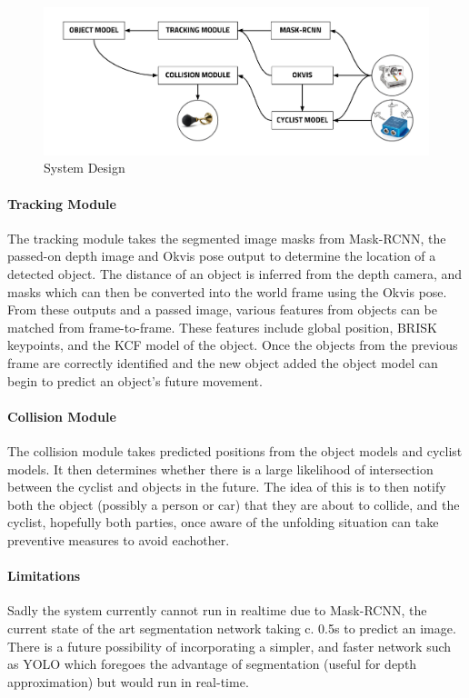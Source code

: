 \documentclass[11pt,twoside]{report}
\begin{document}
\noindent \begin{figure}[h!]
	\includegraphics[width = 1.0\hsize]{figures/software_architecture.png}
	\caption{System Design}
	\label{software_soln}
\end{figure}

\paragraph{Tracking Module}

The tracking module takes the segmented image masks from Mask-RCNN, the passed-on depth image and Okvis pose output to determine the location of a detected object. The distance of an object is inferred from the depth camera, and masks which can then be converted into the world frame using the Okvis pose. From these outputs and a passed image, various features from objects can be matched from frame-to-frame. These features include global position, BRISK keypoints, and the KCF model of the object. Once the objects from the previous frame are correctly identified and the new object added the object model can begin to predict an object's future movement.

\paragraph{Collision Module}
The collision module takes predicted positions from the object models and cyclist models. It then determines whether there is a large likelihood of intersection between the cyclist and objects in the future. The idea of this is to then notify both the object (possibly a person or car) that they are about to collide, and the cyclist, hopefully both parties, once aware of the unfolding situation can take preventive measures to avoid eachother.

\paragraph{Limitations}
Sadly the system currently cannot run in realtime due to Mask-RCNN, the current state of the art segmentation network taking c. 0.5s to predict an image. There is a future possibility of incorporating a simpler, and faster network such as YOLO which foregoes the advantage of segmentation (useful for depth approximation) but would run in real-time.
\end{document}
